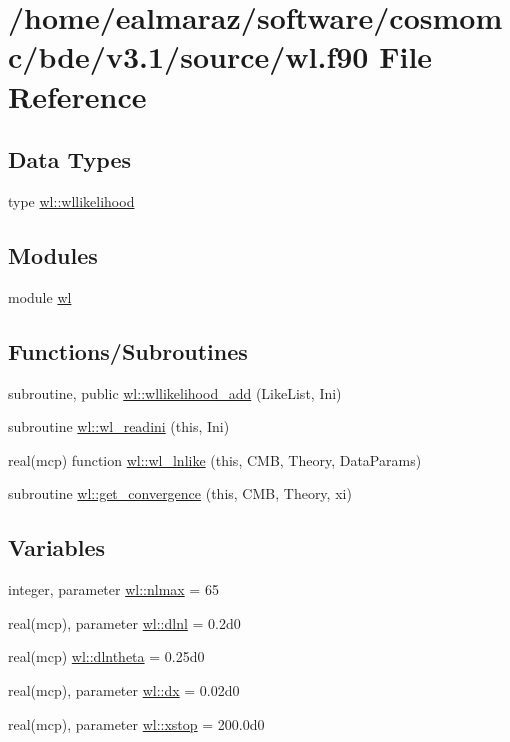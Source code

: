 \hypertarget{wl_8f90}{}\section{/home/ealmaraz/software/cosmomc/bde/v3.1/source/wl.f90 File Reference}
\label{wl_8f90}
\subsection*{Data Types}
\begin{DoxyCompactItemize}
\item 
type \mbox{\hyperlink{structwl_1_1wllikelihood}{wl\+::wllikelihood}}
\end{DoxyCompactItemize}
\subsection*{Modules}
\begin{DoxyCompactItemize}
\item 
module \mbox{\hyperlink{namespacewl}{wl}}
\end{DoxyCompactItemize}
\subsection*{Functions/\+Subroutines}
\begin{DoxyCompactItemize}
\item 
subroutine, public \mbox{\hyperlink{namespacewl_a622c1e8033fcc6aa3474f2fd57263f4b}{wl\+::wllikelihood\+\_\+add}} (Like\+List, Ini)
\item 
subroutine \mbox{\hyperlink{namespacewl_ae5eb8a620a32ecf00fb98f6d7f2e5573}{wl\+::wl\+\_\+readini}} (this, Ini)
\item 
real(mcp) function \mbox{\hyperlink{namespacewl_ae6b71112cf916069d3fc83f99af9168c}{wl\+::wl\+\_\+lnlike}} (this, C\+MB, Theory, Data\+Params)
\item 
subroutine \mbox{\hyperlink{namespacewl_a1238699402e6cd69190706ee7bf42356}{wl\+::get\+\_\+convergence}} (this, C\+MB, Theory, xi)
\end{DoxyCompactItemize}
\subsection*{Variables}
\begin{DoxyCompactItemize}
\item 
integer, parameter \mbox{\hyperlink{namespacewl_afc642e4e15f4400cf7729c68be5aa85d}{wl\+::nlmax}} = 65
\item 
real(mcp), parameter \mbox{\hyperlink{namespacewl_a3359e7d1e42c8d0976460988d6f1f095}{wl\+::dlnl}} = 0.\+2d0
\item 
real(mcp) \mbox{\hyperlink{namespacewl_a1747377f03b9869d4c2736ecc5c83300}{wl\+::dlntheta}} = 0.\+25d0
\item 
real(mcp), parameter \mbox{\hyperlink{namespacewl_af91a3d13d635d84de880af213be86336}{wl\+::dx}} = 0.\+02d0
\item 
real(mcp), parameter \mbox{\hyperlink{namespacewl_a908028e399897f9b001a61a6f78b6349}{wl\+::xstop}} = 200.\+0d0
\end{DoxyCompactItemize}

